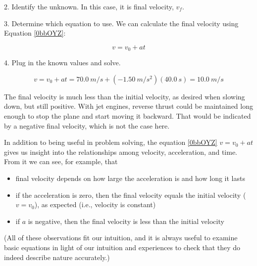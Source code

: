 \documentclass[../../main-ap-physics.tex]{subfiles}
\begin{document}
2. Identify the unknown. In this case, it is final velocity, $v_f$.

\vspace{1ex}

3. Determine which equation to use. We can calculate the final velocity using Equation \eqref{0bbOYZ}:

\begin{equation*}
    v = v_0 + at
\end{equation*}

4. Plug in the known values and solve.

\begin{equation*}
    v = v_0 + at = \SI{70.0}{m/s} + \left(-\SI{1.50}{m/s^2}\right)\left(\SI{40.0}{s}\right) = \SI{10.0}{m/s}
\end{equation*}

The final velocity is much less than the initial velocity, as desired when slowing down, but still positive. With jet engines, reverse thrust could be maintained long enough to stop the plane and start moving it backward. That would be indicated by a negative final velocity, which is not the case here.

\endsolution 

In addition to being useful in problem solving, the equation \eqref{0bbOYZ} $v = v_0 + at$ gives us insight into the relationships among velocity, acceleration, and time. From it we can see, for example, that

\begin{itemize}
    \item final velocity depends on how large the acceleration is and how long it lasts
    \item if the acceleration is zero, then the final velocity equals the initial velocity ($v=v_0$), as expected (i.e., velocity is constant)
    \item if $a$ is negative, then the final velocity is less than the initial velocity
\end{itemize}

(All of these observations fit our intuition, and it is always useful to examine basic equations in light of our intuition and experiences to check that they do indeed describe nature accurately.)

\end{document}
